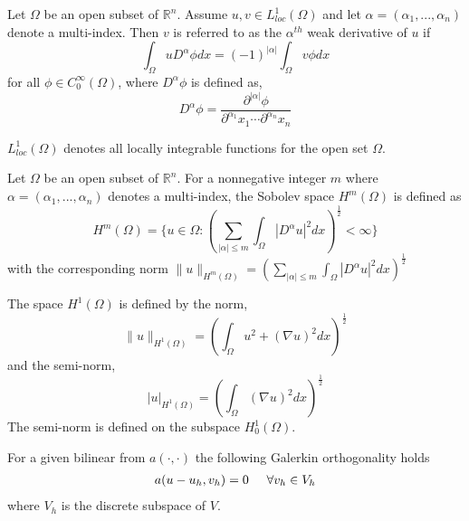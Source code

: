\begin{definition}\label{def:weak_derivative}
Let $\Omega$ be an open subset of $\mathbb{R}^n$. Assume $u,v \in L^1_{loc}(\Omega)$ and let $\alpha=(\alpha_1, ..., \alpha_n)$ denote a multi-index. Then $v$ is referred to as the $\alpha^{th}$ weak derivative of $u$ if
\begin{equation}
\int_\Omega u D^\alpha \phi dx = (-1)^{|\alpha|}\int_\Omega v \phi dx
\end{equation}
for all $\phi \in C_0^\infty(\Omega)$, where $D^\alpha \phi$ is defined as, 
\begin{equation}
D^\alpha \phi = \frac{\partial^{|\alpha|}\phi}{\partial^{\alpha_1}x_1 \cdots \partial^{\alpha_n}x_n} 
\end{equation}
\end{definition}
\begin{remark}
$L^1_{loc}(\Omega)$ denotes all locally integrable functions for the open set $\Omega$.
\end{remark}

\begin{definition}\label{def:sobolev}
Let $\Omega$ be an open subset of $\mathbb{R}^n$. For a nonnegative integer $m$ where $\alpha=(\alpha_1, ..., \alpha_n)$ denotes a multi-index, the Sobolev space $H^m(\Omega)$ is defined as
\begin{equation}
H^m(\Omega) = \{u \in \Omega : (\sum_{|\alpha|\leq m} \int_\Omega |D^\alpha u|^2 dx)^\frac{1}{2} < \infty \}
\end{equation}
with the corresponding norm $\|u\|_{H^m(\Omega)}=(\sum_{|\alpha|\leq m} \int_\Omega |D^\alpha u|^2 dx)^\frac{1}{2}$
\end{definition}

\begin{definition}\label{def:semi_norm}
The space $H^1(\Omega)$ is defined by the norm, 
\begin{equation}
\|u\|_{H^1(\Omega)} = (\int_\Omega u^2 + (\nabla u)^2 dx)^\frac{1}{2}
\end{equation}
and the semi-norm,
\begin{equation}
|u|_{H^1(\Omega)} = (\int_\Omega (\nabla u)^2 dx)^\frac{1}{2}
\end{equation}
The semi-norm is defined on the subspace $H_0^1(\Omega)$.
\end{definition}

\begin{theorem}\label{def:galerkin}
For a given bilinear from $a(\cdot, \cdot)$ the following Galerkin orthogonality holds
\begin{align}
a(u-u_h, v_h) = 0 \hspace{0.5cm} \forall v_h \in V_h
\end{align}
where $V_h$ is the discrete subspace of $V$.
\end{theorem}

